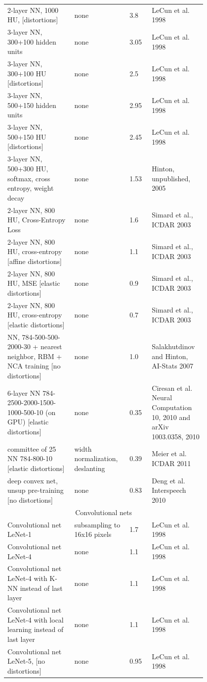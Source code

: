 \documentclass[utf8,usehyperref,14pt]{G7-32}
\begin{document}
\begin{longtable}{p{0.3\linewidth}|p{0.2\linewidth}|p{0.1\linewidth}|p{0.2\linewidth}}
2-layer NN, 1000 HU, [distortions] & none & 3.8 & LeCun et al. 1998  \\ 
3-layer NN, 300+100 hidden units & none & 3.05 & LeCun et al. 1998  \\ 
3-layer NN, 300+100 HU [distortions] & none & 2.5 & LeCun et al. 1998  \\ 
3-layer NN, 500+150 hidden units & none & 2.95 & LeCun et al. 1998  \\ 
3-layer NN, 500+150 HU [distortions] & none & 2.45 & LeCun et al. 1998  \\ 
3-layer NN, 500+300 HU, softmax, cross entropy, weight decay & none & 1.53 & Hinton, unpublished, 2005 \\ 
2-layer NN, 800 HU, Cross-Entropy Loss & none & 1.6 & Simard et al., ICDAR 2003  \\ 
2-layer NN, 800 HU, cross-entropy [affine distortions] & none & 1.1 & Simard et al., ICDAR 2003  \\ 
2-layer NN, 800 HU, MSE [elastic distortions] & none & 0.9 & Simard et al., ICDAR 2003  \\
2-layer NN, 800 HU, cross-entropy [elastic distortions] & none & 0.7 & Simard et al., ICDAR 2003  \\ 
NN, 784-500-500-2000-30 + nearest neighbor, RBM + NCA training [no distortions] & none & 1.0 & Salakhutdinov and Hinton, AI-Stats 2007  \\ 
6-layer NN 784-2500-2000-1500-1000-500-10 (on GPU) [elastic distortions] & none & 0.35 & Ciresan et al. Neural Computation 10, 2010 and arXiv 1003.0358, 2010  \\ 
committee of 25 NN 784-800-10 [elastic distortions] & width normalization, deslanting & 0.39 & Meier et al. ICDAR 2011  \\ 
deep convex net, unsup pre-training [no distortions] & none & 0.83 & Deng et al. Interspeech 2010  \\ 
\multicolumn{4}{c}{Convolutional nets} \\ \hline
Convolutional net LeNet-1 & subsampling to 16x16 pixels & 1.7 & LeCun et al. 1998  \\ 
Convolutional net LeNet-4 & none & 1.1 & LeCun et al. 1998  \\ 
Convolutional net LeNet-4 with K-NN instead of last layer & none & 1.1 & LeCun et al. 1998  \\ 
Convolutional net LeNet-4 with local learning instead of last layer & none & 1.1 & LeCun et al. 1998  \\ 
Convolutional net LeNet-5, [no distortions] & none & 0.95 & LeCun et al. 1998  \\ 

\end{longtable}
\end{document}
